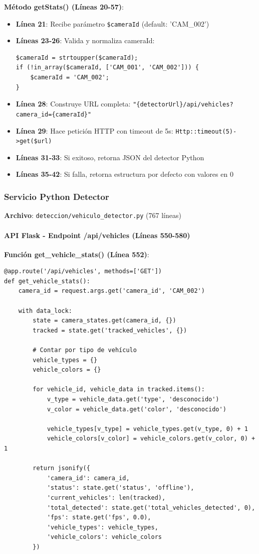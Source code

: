 \textbf{Método getStats() (Líneas 20-57)}:
\begin{itemize}
    \item \textbf{Línea 21}: Recibe parámetro \texttt{\$cameraId} (default: 'CAM\_002')
    \item \textbf{Líneas 23-26}: Valida y normaliza cameraId:
    \begin{lstlisting}[style=phpstyle]
$cameraId = strtoupper($cameraId);
if (!in_array($cameraId, ['CAM_001', 'CAM_002'])) {
    $cameraId = 'CAM_002';
}
    \end{lstlisting}
    \item \textbf{Línea 28}: Construye URL completa: \texttt{"\{detectorUrl\}/api/vehicles?camera\_id=\{cameraId\}"}
    \item \textbf{Línea 29}: Hace petición HTTP con timeout de 5s: \texttt{Http::timeout(5)->get(\$url)}
    \item \textbf{Líneas 31-33}: Si exitoso, retorna JSON del detector Python
    \item \textbf{Líneas 35-42}: Si falla, retorna estructura por defecto con valores en 0
\end{itemize}

\subsubsection{Servicio Python Detector}

\textbf{Archivo}: \texttt{deteccion/vehiculo\_detector.py} (767 líneas)

\paragraph{API Flask - Endpoint /api/vehicles (Líneas 550-580)}

\textbf{Función get\_vehicle\_stats() (Línea 552)}:
\begin{lstlisting}[style=pythonstyle, caption={Endpoint de Estadísticas}]
@app.route('/api/vehicles', methods=['GET'])
def get_vehicle_stats():
    camera_id = request.args.get('camera_id', 'CAM_002')
    
    with data_lock:
        state = camera_states.get(camera_id, {})
        tracked = state.get('tracked_vehicles', {})
        
        # Contar por tipo de vehículo
        vehicle_types = {}
        vehicle_colors = {}
        
        for vehicle_id, vehicle_data in tracked.items():
            v_type = vehicle_data.get('type', 'desconocido')
            v_color = vehicle_data.get('color', 'desconocido')
            
            vehicle_types[v_type] = vehicle_types.get(v_type, 0) + 1
            vehicle_colors[v_color] = vehicle_colors.get(v_color, 0) + 1
        
        return jsonify({
            'camera_id': camera_id,
            'status': state.get('status', 'offline'),
            'current_vehicles': len(tracked),
            'total_detected': state.get('total_vehicles_detected', 0),
            'fps': state.get('fps', 0.0),
            'vehicle_types': vehicle_types,
            'vehicle_colors': vehicle_colors
        })
\end{lstlisting}

